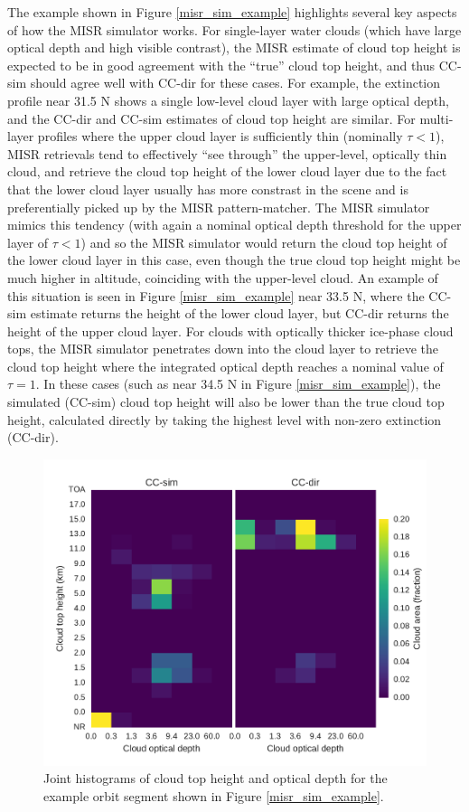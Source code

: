 The example shown in Figure \ref{misr_sim_example} highlights several key aspects of how the MISR simulator works. For single-layer water clouds (which have large optical depth and high visible contrast), the MISR estimate of cloud top height is expected to be in good agreement with the ``true'' cloud top height, and thus CC-sim should agree well with CC-dir for these cases. For example, the extinction profile near 31.5 N shows a single low-level cloud layer with large optical depth, and the CC-dir and CC-sim estimates of cloud top height are similar. For multi-layer profiles where the upper cloud layer is sufficiently thin (nominally $\tau < 1$), MISR retrievals tend to effectively ``see through'' the upper-level, optically thin cloud, and retrieve the cloud top height of the lower cloud layer due to the fact that the lower cloud layer usually has more constrast in the scene and is preferentially picked up by the MISR pattern-matcher. The MISR simulator mimics this tendency (with again a nominal optical depth threshold for the upper layer of $\tau < 1$) and so the MISR simulator would return the cloud top height of the lower cloud layer in this case, even though the true cloud top height might be much higher in altitude, coinciding with the upper-level cloud. An example of this situation is seen in Figure \ref{misr_sim_example} near 33.5 N, where the CC-sim estimate returns the height of the lower cloud layer, but CC-dir returns the height of the upper cloud layer. For clouds with optically thicker ice-phase cloud tops, the MISR simulator penetrates down into the cloud layer to retrieve the cloud top height where the integrated optical depth reaches a nominal value of $\tau = 1$. In these cases (such as near 34.5 N in Figure \ref{misr_sim_example}), the simulated (CC-sim) cloud top height will also be lower than the true cloud top height, calculated directly by taking the highest level with non-zero extinction (CC-dir).

\begin{figure}
\centering
\includegraphics[width=\columnwidth]{graphics/misr_clmisr_example.pdf}
\caption{Joint histograms of cloud top height and optical depth for the example orbit segment shown in Figure \ref{misr_sim_example}.}
\label{misr_clmisr_example}
\end{figure}

